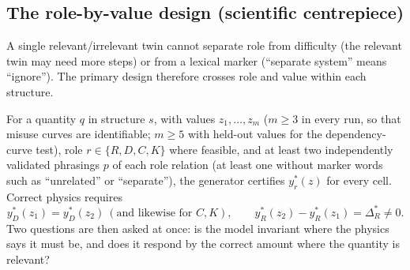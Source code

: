 \documentclass[10pt,a4paper]{article}
\begin{document}
\subsection{The role-by-value design (scientific centrepiece)}
\label{sec:rolevalue}

A single relevant/irrelevant twin cannot separate role from difficulty (the relevant twin may need more steps)
or from a lexical marker (``separate system'' means ``ignore''). The primary design therefore crosses role and
value within each structure.

For a quantity $q$ in structure $s$, with values $z_1,\dots,z_m$ ($m\ge3$ in every run, so that misuse curves are
identifiable; $m\ge5$ with held-out values for the dependency-curve test), role $r\in\{R, D, C, K\}$ where feasible, and at least two
independently validated phrasings $p$ of each role relation (at least one without marker words such as
``unrelated'' or ``separate''), the generator certifies $y^*_r(z)$ for every cell. Correct physics requires
\[
y^*_D(z_1)=y^*_D(z_2)\ (\text{and likewise for } C, K),\qquad
y^*_R(z_2)-y^*_R(z_1)=\Delta^*_R\neq 0 .
\]
Two questions are then asked at once: is the model invariant where the physics says it must be, and does it
respond by the correct amount where the quantity is relevant?
\end{document}
